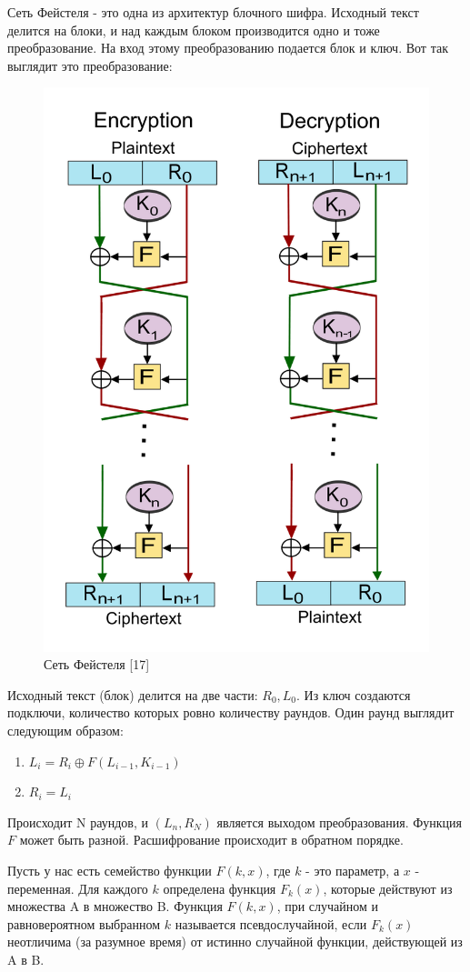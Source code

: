 \documentclass[colorthm]{./civarticle}
\begin{document}
\begin{definition}
  Сеть Фейстеля - это одна из архитектур блочного шифра. Исходный текст делится на блоки, и над каждым блоком производится одно и тоже преобразование. На вход этому преобразованию подается блок и ключ. Вот так выглядит это преобразование: 

  \begin{figure}[H]
      \centering
      \includegraphics[width=0.5\linewidth]{800px-Feistel_cipher_diagram_en.svg.png}
      \caption{Сеть Фейстеля [17]}
      \label{fig:enter-label}
  \end{figure}

    Исходный текст (блок) делится на две части: $R_0, L_0$. Из ключ создаются подключи, количество которых ровно количеству раундов. Один раунд выглядит следующим образом:
    \begin{enumerate}
        \item $L_i = R_i \oplus F(L_{i-1}, K_{i-1})$
        \item $R_i = L_i$
    \end{enumerate}

    Происходит N раундов, и $(L_n, R_N)$ является выходом преобразования. Функция $F$ может быть разной. Расшифрование происходит в обратном порядке.
  
\end{definition}

\begin{definition}
    Пусть у нас есть семейство функции $F(k, x)$, где $k$ - это параметр, а $x$ - переменная. Для каждого $k$ определена функция $F_k(x)$, которые действуют из множества A в множество B. Функция $F(k, x)$, при случайном и равновероятном выбранном $k$ называется псевдослучайной, если $F_k(x)$ неотличима (за разумное время) от истинно случайной функции, действующей из A в B.
\end{definition}
\end{document}
